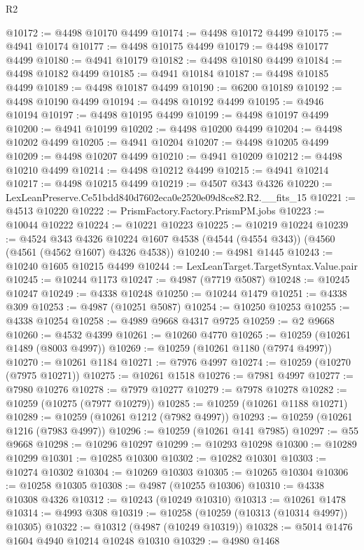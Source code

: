 \begin{lexlean}{R2}
\begin{coremodule}
@10172 := @4498 @10170 @4499
@10174 := @4498 @10172 @4499
@10175 := @4941 @10174
@10177 := @4498 @10175 @4499
@10179 := @4498 @10177 @4499
@10180 := @4941 @10179
@10182 := @4498 @10180 @4499
@10184 := @4498 @10182 @4499
@10185 := @4941 @10184
@10187 := @4498 @10185 @4499
@10189 := @4498 @10187 @4499
@10190 := @6200 @10189
@10192 := @4498 @10190 @4499
@10194 := @4498 @10192 @4499
@10195 := @4946 @10194
@10197 := @4498 @10195 @4499
@10199 := @4498 @10197 @4499
@10200 := @4941 @10199
@10202 := @4498 @10200 @4499
@10204 := @4498 @10202 @4499
@10205 := @4941 @10204
@10207 := @4498 @10205 @4499
@10209 := @4498 @10207 @4499
@10210 := @4941 @10209
@10212 := @4498 @10210 @4499
@10214 := @4498 @10212 @4499
@10215 := @4941 @10214
@10217 := @4498 @10215 @4499
@10219 := @4507 @343 @4326
@10220 := LexLeanPreserve.Ce51bdd840d7602eca0e2520e09d8ce82.R2.__fits_15
@10221 := @4513 @10220
@10222 := PrismFactory.Factory.PrismPM.jobs
@10223 := @10044 @10222
@10224 := @10221 @10223
@10225 := @10219 @10224
@10239 := @4524
    @343
    @4326
    @10224
    @1607
    @4538
    (@4544 (@4554 @343))
    (@4560 (@4561 (@4562 @1607) @4326 @4538))
@10240 := @4981 @1445
@10243 := @10240 @1605 @10215 @4499
@10244 := LexLeanTarget.TargetSyntax.Value.pair
@10245 := @10244 @1173
@10247 := @4987 (@7719 @5087)
@10248 := @10245 @10247
@10249 := @4338 @10248
@10250 := @10244 @1479
@10251 := @4338 @309
@10253 := @4987 (@10251 @5087)
@10254 := @10250 @10253
@10255 := @4338 @10254
@10258 := @4989 @9668 @4317 @9725
@10259 := @2 @9668
@10260 := @4532 @4399
@10261 := @10260 @4770
@10265 := @10259 (@10261 @1489 (@8003 @4997))
@10269 := @10259 (@10261 @1180 (@7974 @4997))
@10270 := @10261 @1184
@10271 := @7976 @4997
@10274 := @10259 (@10270 (@7975 @10271))
@10275 := @10261 @1518
@10276 := @7981 @4997
@10277 := @7980 @10276
@10278 := @7979 @10277
@10279 := @7978 @10278
@10282 := @10259 (@10275 (@7977 @10279))
@10285 := @10259 (@10261 @1188 @10271)
@10289 := @10259 (@10261 @1212 (@7982 @4997))
@10293 := @10259 (@10261 @1216 (@7983 @4997))
@10296 := @10259 (@10261 @141 @7985)
@10297 := @55 @9668
@10298 := @10296 @10297
@10299 := @10293 @10298
@10300 := @10289 @10299
@10301 := @10285 @10300
@10302 := @10282 @10301
@10303 := @10274 @10302
@10304 := @10269 @10303
@10305 := @10265 @10304
@10306 := @10258 @10305
@10308 := @4987 (@10255 @10306)
@10310 := @4338 @10308 @4326
@10312 := @10243 (@10249 @10310)
@10313 := @10261 @1478
@10314 := @4993 @308
@10319 := @10258 (@10259 (@10313 (@10314 @4997)) @10305)
@10322 := @10312 (@4987 (@10249 @10319))
@10328 := @5014 @1476 @1604 @4940 @10214 @10248 @10310
@10329 := @4980 @1468

\end{coremodule}
\end{lexlean}
